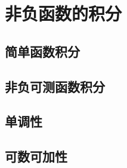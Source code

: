 \section{非负函数的积分}
\label{b1:sec:0501}


\subsection{简单函数积分}
\label{b1:subsec:050101}

\subsection{非负可测函数积分}
\label{b1:subsec:050102}

\subsection{单调性}
\label{b1:subsec:050103}

\subsection{可数可加性}
\label{b1:subsec:050104}


